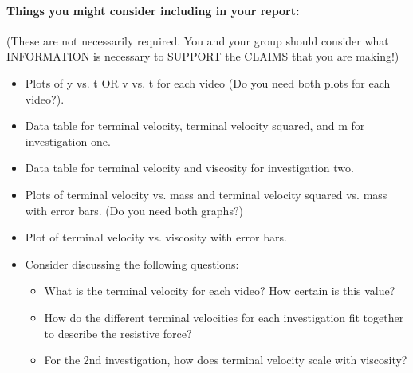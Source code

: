 \paragraph{Things you might consider including in your report:}
(These are not necessarily required. You and your group should consider what INFORMATION is necessary to SUPPORT the CLAIMS that you are making!)
\begin{itemize}
\item Plots of y vs. t OR v vs. t for each video (Do you need both plots for each video?).
\item Data table for terminal velocity, terminal velocity squared, and m for investigation one.
\item Data table for terminal velocity and viscosity for investigation two.
\item Plots of terminal velocity vs. mass and terminal velocity squared vs. mass with error bars.
(Do you need both graphs?)
\item Plot of terminal velocity vs. viscosity with error bars.
\item Consider discussing the following questions:
	\begin{itemize}
	\item What is the terminal velocity for each video? How certain is this value?
	\item How do the different terminal velocities for each investigation fit together to describe the resistive force?
	\item For the 2nd investigation, how does terminal velocity scale with viscosity?
	\end{itemize}
\end{itemize}

